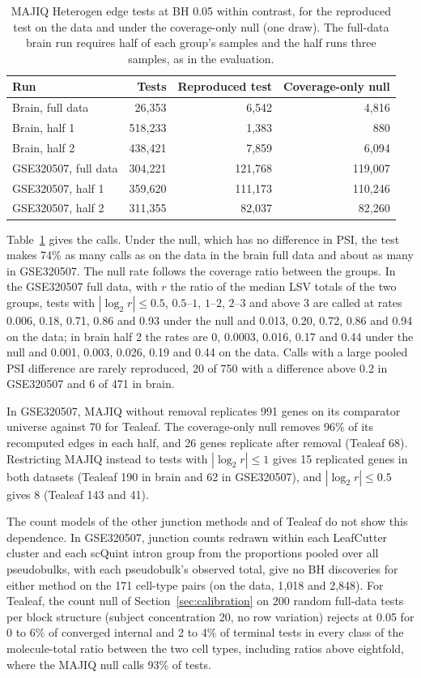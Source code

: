 \documentclass[11pt]{article}
\begin{document}
\begin{table}[ht]
\centering
\small
\begin{tabular}{lrrr}
\toprule
Run & Tests & Reproduced test & Coverage-only null\\
\midrule
Brain, full data & 26{,}353 & 6{,}542 & 4{,}816\\
Brain, half 1 & 518{,}233 & 1{,}383 & 880\\
Brain, half 2 & 438{,}421 & 7{,}859 & 6{,}094\\
GSE320507, full data & 304{,}221 & 121{,}768 & 119{,}007\\
GSE320507, half 1 & 359{,}620 & 111{,}173 & 110{,}246\\
GSE320507, half 2 & 311{,}355 & 82{,}037 & 82{,}260\\
\bottomrule
\end{tabular}
\caption{MAJIQ Heterogen edge tests at BH 0.05 within contrast, for the reproduced test on the data and under the coverage-only null (one draw). The full-data brain run requires half of each group's samples and the half runs three samples, as in the evaluation.}
\label{tab:majiq-null}
\end{table}

Table~\ref{tab:majiq-null} gives the calls. Under the null, which has no difference in PSI, the test makes 74\% as many calls as on the data in the brain full data and about as many in GSE320507. The null rate follows the coverage ratio between the groups. In the GSE320507 full data, with $r$ the ratio of the median LSV totals of the two groups, tests with $|\log_2 r|\le0.5$, $0.5$--$1$, $1$--$2$, $2$--$3$ and above 3 are called at rates 0.006, 0.18, 0.71, 0.86 and 0.93 under the null and 0.013, 0.20, 0.72, 0.86 and 0.94 on the data; in brain half 2 the rates are 0, 0.0003, 0.016, 0.17 and 0.44 under the null and 0.001, 0.003, 0.026, 0.19 and 0.44 on the data. Calls with a large pooled PSI difference are rarely reproduced, 20 of 750 with a difference above 0.2 in GSE320507 and 6 of 471 in brain.

In GSE320507, MAJIQ without removal replicates 991 genes on its comparator universe against 70 for Tealeaf. The coverage-only null removes 96\% of its recomputed edges in each half, and 26 genes replicate after removal (Tealeaf 68). Restricting MAJIQ instead to tests with $|\log_2 r|\le1$ gives 15 replicated genes in both datasets (Tealeaf 190 in brain and 62 in GSE320507), and $|\log_2 r|\le0.5$ gives 8 (Tealeaf 143 and 41).

The count models of the other junction methods and of Tealeaf do not show this dependence. In GSE320507, junction counts redrawn within each LeafCutter cluster and each scQuint intron group from the proportions pooled over all pseudobulks, with each pseudobulk's observed total, give no BH discoveries for either method on the 171 cell-type pairs (on the data, 1{,}018 and 2{,}848). For Tealeaf, the count null of Section~\ref{sec:calibration} on 200 random full-data tests per block structure (subject concentration 20, no row variation) rejects at 0.05 for 0 to 6\% of converged internal and 2 to 4\% of terminal tests in every class of the molecule-total ratio between the two cell types, including ratios above eightfold, where the MAJIQ null calls 93\% of tests.
\end{document}
